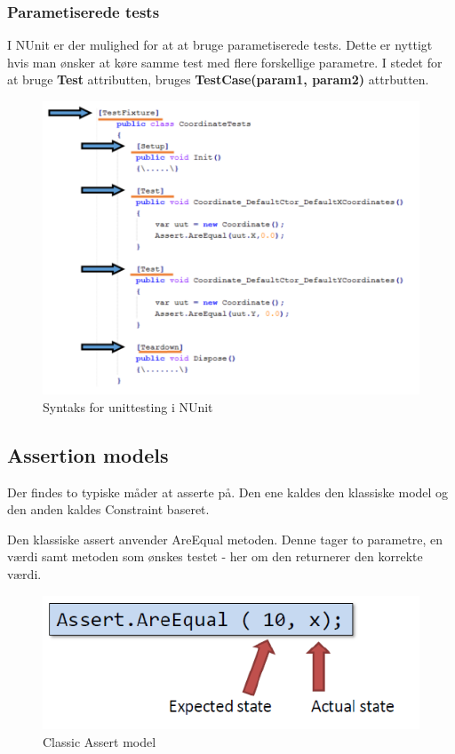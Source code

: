 \subsubsection{Parametiserede tests}
I NUnit er der mulighed for at at bruge parametiserede tests. Dette er nyttigt hvis man ønsker at køre samme test med flere forskellige parametre. I stedet for at bruge \textbf{Test} attributten, bruges \textbf{TestCase(param1, param2)} attrbutten.

\begin{figure}[H]
\centering
\includegraphics[width=0.7\linewidth]{figs/testFixture.PNG}
\caption{Syntaks for unittesting i NUnit}
\label{fig:testFixture}
\end{figure}

\subsection{Assertion models}
Der findes to typiske måder at asserte på. Den ene kaldes den klassiske model og den anden kaldes Constraint baseret.

Den klassiske assert anvender AreEqual metoden. Denne tager to parametre, en værdi samt metoden som ønskes testet - her om den returnerer den korrekte værdi.
\begin{figure}
\centering
\includegraphics[width=0.7\linewidth]{figs/classicAssert.PNG}
\caption{Classic Assert model}
\label{fig:classicAssert}
\end{figure}



